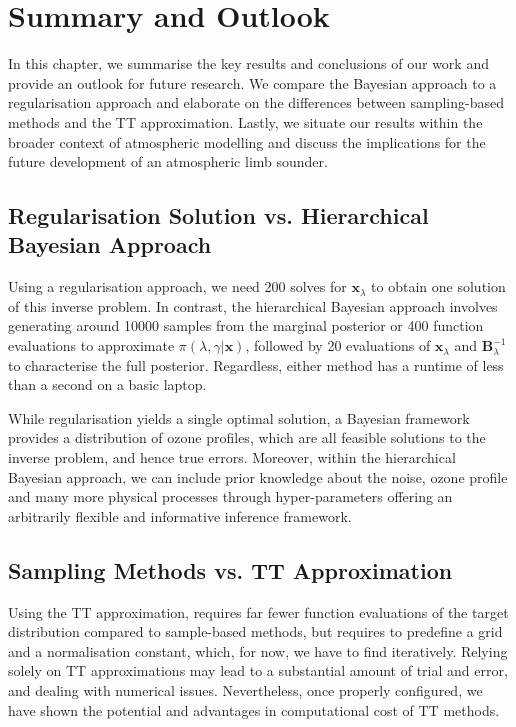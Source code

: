 \chapter{Summary and Outlook}
\label{ch:Concl}
In this chapter, we summarise the key results and conclusions of our work and provide an outlook for future research.
We compare the Bayesian approach to a regularisation approach and elaborate on the differences between sampling-based methods and the TT approximation.
Lastly, we situate our results within the broader context of atmospheric modelling and discuss the implications for the future development of an atmospheric limb sounder.



\section{Regularisation Solution vs. Hierarchical Bayesian Approach}
Using a regularisation approach, we need 200 solves for $\bm{x}_{\lambda}$ to obtain one solution of this inverse problem.
In contrast, the hierarchical Bayesian approach involves generating around 10000 samples from the marginal posterior or 400 function evaluations to approximate $\pi(\lambda, \gamma | \bm{x})$, followed by 20 evaluations of $\bm{x}_{\lambda}$ and $\bm{B}^{-1}_{\lambda}$ to characterise the full posterior.
Regardless, either method has a runtime of less than a second on a basic laptop.

While regularisation yields a single optimal solution, a Bayesian framework provides a distribution of ozone profiles, which are all feasible solutions to the inverse problem, and hence true errors.
Moreover, within the hierarchical Bayesian approach, we can include prior knowledge about the noise, ozone profile and many more physical processes through hyper-parameters offering an arbitrarily flexible and informative inference framework.


\section{Sampling Methods vs. TT Approximation}
Using the TT approximation, requires far fewer function evaluations of the target distribution compared to sample-based methods, but requires to predefine a grid and a normalisation constant, which, for now, we have to find iteratively.
Relying solely on TT approximations may lead to a substantial amount of trial and error, and dealing with numerical issues.
Nevertheless, once properly configured, we have shown the potential and advantages in computational cost of TT methods.

